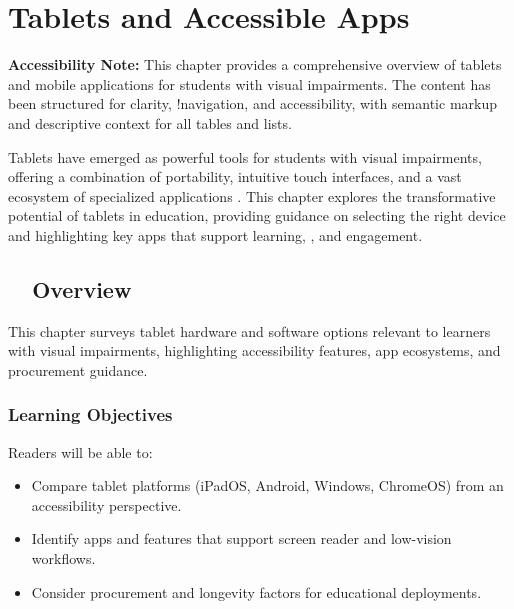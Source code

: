 \chapter{Tablets and Accessible Apps}\label{ch2:tablets}

\begin{raggedright}
	\textbf{Accessibility Note:} This chapter provides a comprehensive overview of tablets and mobile applications for students with visual impairments. The content has been structured for clarity, !navigation, and accessibility, with semantic markup and descriptive context for all tables and lists.
\end{raggedright}

Tablets have emerged as powerful tools for students with visual impairments, offering a combination of portability, intuitive touch interfaces, and a vast ecosystem of specialized applications \supercite{Day2021, Kelly2011}. This chapter explores the transformative potential of tablets in education, providing guidance on selecting the right device and highlighting key apps that support learning, , and engagement.

\section{~~Overview}\label{chap2:overview}
This chapter surveys tablet hardware and software options relevant to learners with visual impairments, highlighting accessibility features, app ecosystems, and procurement guidance.

\subsection{Learning Objectives}\label{chap2:learning-objectives}
Readers will be able to:
\begin{itemize}
\item Compare tablet platforms (iPadOS, Android, Windows, ChromeOS) from an accessibility perspective.
\item Identify apps and features that support screen reader and low-vision workflows.
\item Consider procurement and longevity factors for educational deployments.
\end{itemize}


